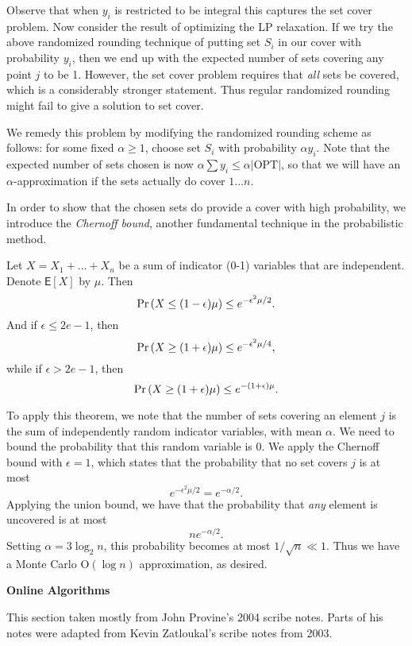 \documentclass{article}
\renewcommand{\Pr}[1]{\textrm{\textup{Pr}}\left( #1 \right)}
\newcommand{\E}{\mbox{$\mathsf E$}}
\begin{document}
Observe that when $y_i$ is restricted to be integral this captures the set cover problem.  Now consider the result of optimizing the LP relaxation.  If we try the above randomized rounding technique of putting set $S_i$ in our cover with probability $y_i$, then we end up with the expected number of sets covering any point $j$ to be 1.  However, the set cover problem requires that \emph{all} sets be covered, which is a considerably stronger statement.  Thus regular randomized rounding might fail to give a solution to set cover.

We remedy this problem by modifying the randomized rounding scheme as follows: for some fixed $\alpha\geq 1$, choose set $S_i$ with probability $\alpha y_i$.  Note that the expected number of sets chosen is now $\alpha\sum y_i\leq \alpha |\textrm{OPT}|$, so that we will have an $\alpha$-approximation if the sets actually do cover $1...n$.

In order to show that the chosen sets do provide a cover with high probability, we introduce the \emph{Chernoff bound}, another fundamental technique in the probabilistic method.

\begin{theorem}
Let $X=X_1+...+X_n$ be a sum of indicator (0-1) variables that are independent.  Denote $\E[X]$ by $\mu$.  Then $$\Pr{X\leq(1-\epsilon)\mu}\leq e^{-\epsilon^2\mu/2}.$$
And if $\epsilon\leq 2e-1$, then $$\Pr{X\geq(1+\epsilon)\mu}\leq e^{-\epsilon^2\mu/4},$$
while if $\epsilon>2e-1$, then $$\Pr{X\geq(1+\epsilon)\mu}\leq e^{-(1+\epsilon)\mu}.$$
\end{theorem}
To apply this theorem, we note that the number of sets covering an element $j$ is the sum of independently random indicator variables, with mean $\alpha$.  We need to bound the probability that this random variable is 0.  We apply the Chernoff bound with $\epsilon=1$, which states that the probability that no set covers $j$ is at most $$e^{-\epsilon^2\mu/2}=e^{-\alpha/2}.$$
Applying the union bound, we have that the probability that \emph{any} element is uncovered is at most $$ne^{-\alpha/2}.$$  Setting $\alpha=3\log_2 n$, this probability becomes at most $1/\sqrt{n}\ll 1$.  Thus we have a Monte Carlo $\textrm{O}(\log n)$ approximation, as desired.

\begin{center}
{\large \bf Online Algorithms}
\end{center}

This section taken mostly from John Provine's 2004 scribe notes. Parts of his notes were  adapted from Kevin Zatloukal's scribe notes from 2003.
\end{document}
